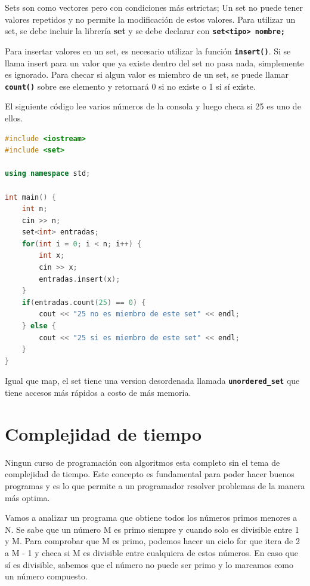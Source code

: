 \documentclass{article}
\begin{document}
Sets son como vectores pero con condiciones más estrictas; Un set no puede tener valores repetidos y no permite la modificación de estos valores. Para utilizar un set, se debe incluir la librería \textbf{set} y se debe declarar con \textbf{\lstinline{set<tipo> nombre;}}

Para insertar valores en un set, es necesario utilizar la función \textbf{\lstinline{insert()}}. Si se llama insert para un valor que ya existe dentro del set no pasa nada, simplemente es ignorado. Para checar si algun valor es miembro de un set, se puede llamar \textbf{\lstinline{count()}} sobre ese elemento y retornará 0 si no existe o 1 si sí existe.

El siguiente código lee varios números de la consola y luego checa si 25 es uno de ellos.

\begin{lstlisting}[language=C++, caption=Sets]
#include <iostream>
#include <set>

using namespace std;

int main() {
    int n;
    cin >> n;
    set<int> entradas;
    for(int i = 0; i < n; i++) {
        int x;
        cin >> x;
        entradas.insert(x);
    }
    if(entradas.count(25) == 0) {
        cout << "25 no es miembro de este set" << endl;
    } else {
        cout << "25 si es miembro de este set" << endl;
    }
}
\end{lstlisting}

Igual que map, el set tiene una version desordenada llamada \textbf{\lstinline{unordered_set}} que tiene accesos más rápidos a costo de más memoria.

\section{Complejidad de tiempo}

Ningun curso de programación con algoritmos esta completo sin el tema de complejidad de tiempo. Este concepto es fundamental para poder hacer buenos programas y es lo que permite a un programador resolver problemas de la manera más optima.

Vamos a analizar un programa que obtiene todos los números primos menores a N. Se sabe que un número M es primo siempre y cuando solo es divisible entre 1 y M. Para comprobar que M es primo, podemos hacer un ciclo for que itera de 2 a M - 1 y checa si M es divisible entre cualquiera de estos números. En caso que sí es divisible, sabemos que el número no puede ser primo y lo marcamos como un número compuesto.
\end{document}
